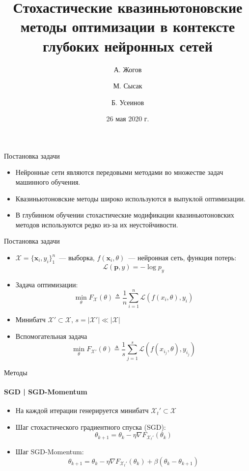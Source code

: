 \documentclass{beamer}
\title[Методы оптимизации]{Стохастические квазиньютоновские методы оптимизации в контексте глубоких нейронных сетей}
\author[]{А. Жогов \and М. Сысак \and Б. Усеинов}
\institute[МФТИ]{Московский физико-технический институт, Москва, Россия}
\date{26 мая 2020 г.}
\begin{document}
\setlength{\abovecaptionskip}{-2pt}
\setlength{\belowcaptionskip}{6pt}
\maketitle


\begin{frame}{Постановка задачи}
\begin{itemize}
    \item Нейронные сети являются передовыми методами во множестве задач машинного обучения.
    \item Квазиньютоновские методы широко используются в выпуклой оптимизации.
    \item В глубинном обучении стохастические модификации квазиньютоновских методов используются редко из-за их неустойчивости.
\end{itemize}
\end{frame}


\begin{frame}{Постановка задачи}
\begin{itemize}
    \item $\mathcal{X} = \{\mathbf{x}_i, y_i\}_1^n$~--- выборка, $f(\mathbf{x}_i, \theta)$~--- нейронная сеть, функция потерь:
    $$\mathcal{L}(\mathbf{p}, y) = -\log p_y$$
    \item Задача оптимизации:
    $$\min_\theta F_\mathcal{X}(\theta) \triangleq \frac1n \sum_{i=1}^n \mathcal{L}(f(x_i, \theta), y_i)$$
    \item Минибатч $\mathcal{X}' \subset \mathcal{X},\, s = |\mathcal{X}'| \ll |\mathcal{X}|$
    \item Вспомогательная задача
    $$\min_\theta F_{\mathcal{X}'}(\theta) \triangleq \frac1s \sum_{j=1}^s \mathcal{L}(f(x_{i_j}, \theta), y_{i_j})$$
\end{itemize}
\end{frame}


\begin{frame}{Методы}
\framesubtitle{SGD | SGD-Momentum}
\begin{itemize}
    \item На каждой итерации генерируется минибатч $\mathcal{X}_t' \subset \mathcal{X}$
    \item Шаг стохастического градиентного спуска (SGD):
    $$\theta_{k+1} = \theta_k - \eta \nabla F_{\mathcal{X}_t'} (\theta_k)$$
    \item Шаг SGD-Momentum:
    $$\theta_{k+1} = \theta_k - \eta \nabla F_{\mathcal{X}_t'}(\theta_k) + \beta (\theta_k - \theta_{k+1})$$
\end{itemize}
\end{frame}
\end{document}
